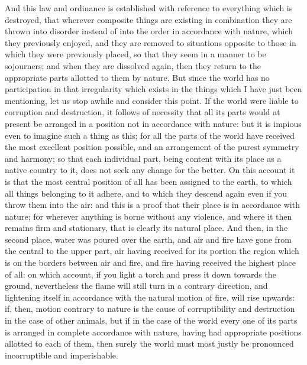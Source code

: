 And this law and ordinance is established with reference to everything which is destroyed, that
wherever composite things are existing in combination they are thrown into disorder instead of into
the order in accordance with nature, which they previously enjoyed, and they are removed to
situations opposite to those in which they were previously placed, so that they seem in a manner to
be sojourners; and when they are dissolved again, then they return to the appropriate parts allotted
to them by nature. But since the world has no participation in that irregularity which exists in the
things which I have just been mentioning, let us stop awhile and consider this point. If the world
were liable to corruption and destruction, it follows of necessity that all its parts would at present be
arranged in a position not in accordance with nature: but it is impious even to imagine such a thing
as this; for all the parts of the world have received the most excellent position possible, and an
arrangement of the purest symmetry and harmony; so that each individual part, being content with
its place as a native country to it, does not seek any change for the better. On this account it is that
the most central position of all has been assigned to the earth, to which all things belonging to it
adhere, and to which they descend again even if you throw them into the air: and this is a proof that
their place is in accordance with nature; for wherever anything is borne without any violence, and
where it then remains firm and stationary, that is clearly its natural place. And then, in the second
place, water was poured over the earth, and air and fire have gone from the central to the upper
part, air having received for its portion the region which is on the borders between air and fire, and
fire having received the highest place of all: on which account, if you light a torch and press it down
towards the ground, nevertheless the flame will still turn in a contrary direction, and lightening itself
in accordance with the natural motion of fire, will rise upwards: if, then, motion contrary to nature is
the cause of corruptibility and destruction in the case of other animals, but if in the case of the
world every one of its parts is arranged in complete accordance with nature, having had
appropriate positions allotted to each of them, then surely the world must most justly be
pronounced incorruptible and imperishable.

